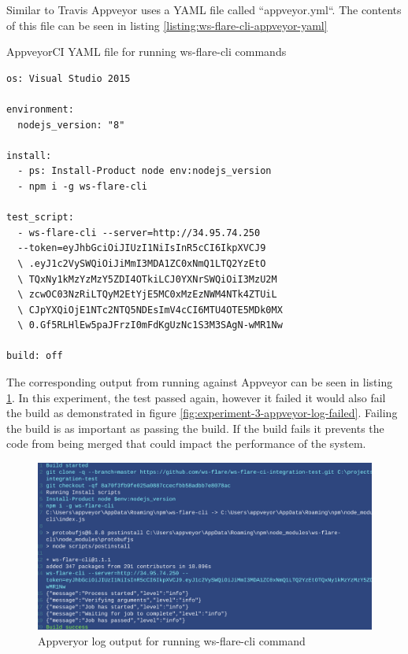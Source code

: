 Similar to Travis Appveyor uses a YAML file called ``appveyor.yml``. The contents of this file can be seen in listing \ref{listing:ws-flare-cli-appveyor-yaml}

\begin{listing}[H]
    \caption{AppveyorCI YAML file for running ws-flare-cli commands}
    \label{listing:ws-flare-cli-appveyor-yaml}
    \begin{verbatim}
os: Visual Studio 2015

environment:
  nodejs_version: "8"

install:
  - ps: Install-Product node env:nodejs_version
  - npm i -g ws-flare-cli

test_script:
  - ws-flare-cli --server=http://34.95.74.250 
  --token=eyJhbGciOiJIUzI1NiIsInR5cCI6IkpXVCJ9
  \ .eyJ1c2VySWQiOiJiMmI3MDA1ZC0xNmQ1LTQ2YzEtO
  \ TQxNy1kMzYzMzY5ZDI4OTkiLCJ0YXNrSWQiOiI3MzU2M
  \ zcwOC03NzRiLTQyM2EtYjE5MC0xMzEzNWM4NTk4ZTUiL
  \ CJpYXQiOjE1NTc2NTQ5NDEsImV4cCI6MTU4OTE5MDk0MX
  \ 0.Gf5RLHlEw5paJFrzI0mFdKgUzNc1S3M3SAgN-wMR1Nw

build: off
\end{verbatim}
\end{listing}

The corresponding output from running against Appveyor can be seen in listing \ref{fig:experiment-3-appveyor-log}. In this experiment, the test passed again, however it failed it would also fail the build as demonstrated in figure \ref{fig:experiment-3-appveyor-log-failed}. Failing the build is as important as passing the build. If the build fails it prevents the code from being merged that could impact the performance of the system.

\begin{figure}[H]
  \centering
    \includegraphics[width=1\textwidth]{figures/experiments/experiment-3/appveyor-output.png}
    \caption{Appveryor log output for running ws-flare-cli command}
    \label{fig:experiment-3-appveyor-log}
\end{figure}

